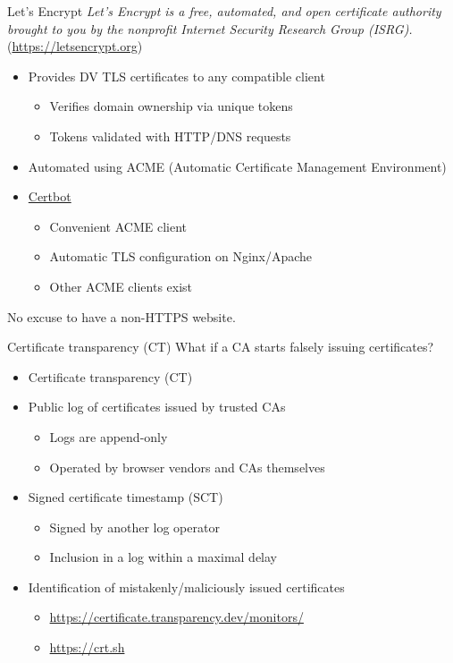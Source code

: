 \begin{frame}{Let's Encrypt}
  \pause
  \textit{Let's Encrypt is a free, automated, and open certificate authority brought to you by the nonprofit Internet Security Research Group (ISRG).} ({\scriptsize\url{https://letsencrypt.org}})
  \begin{itemize}[<+(1)->]
    \item Provides DV TLS certificates to any compatible client
    \begin{itemize}
      \item Verifies domain ownership via unique tokens
      \item Tokens validated with HTTP/DNS requests
    \end{itemize}
    \item Automated using ACME (Automatic Certificate Management Environment)
    \item \href{https://certbot.eff.org}{Certbot}
    \begin{itemize}
      \item Convenient ACME client
      \item Automatic TLS configuration on Nginx/Apache
      \item Other ACME clients exist
    \end{itemize}
  \end{itemize}

  \pause
  No excuse to have a non-HTTPS website.
\end{frame}

\begin{frame}{Certificate transparency (CT)}
  What if a CA starts falsely issuing certificates?
  \begin{itemize}[<+(1)->]
    \item Certificate transparency (CT)
    \item Public log of certificates issued by trusted CAs
    \begin{itemize}
      \item Logs are append-only
      \item Operated by browser vendors and CAs themselves
    \end{itemize}
    \item Signed certificate timestamp (SCT)
    \begin{itemize}
      \item Signed by another log operator
      \item Inclusion in a log within a maximal delay
    \end{itemize}
    \item Identification of mistakenly/maliciously issued certificates
    \begin{itemize}
      \item {\small{\url{https://certificate.transparency.dev/monitors/}}}
      \item {\small{\url{https://crt.sh}}}
    \end{itemize}
  \end{itemize}
\end{frame}

